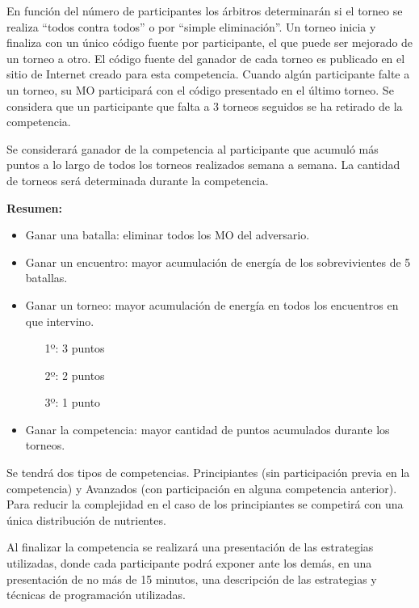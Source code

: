 \documentclass[11pt,a4paper]{article}
\begin{document}
En función del número de participantes los árbitros determinarán si el torneo se realiza ``todos contra todos'' o por ``simple eliminación''. Un torneo inicia y finaliza con un único código fuente por participante, el que puede ser mejorado de un torneo a otro. El código fuente del ganador de cada torneo es publicado en el sitio de Internet creado para esta competencia.
Cuando algún participante falte a un torneo, su MO participará con el código presentado en el último torneo. Se considera que un participante que falta a 3 torneos seguidos se ha retirado de la competencia.

Se considerará ganador de la competencia al participante que acumuló más puntos a lo largo de todos los torneos realizados semana a semana. La cantidad de torneos será determinada durante la competencia.

{\bf Resumen:}
\begin{itemize}
    \item Ganar una batalla: eliminar todos los MO del adversario.
    \item Ganar un encuentro: mayor acumulación de energía de los sobrevivientes de 5 batallas.
    \item Ganar un torneo: mayor acumulación de energía en todos los encuentros en que intervino.
    \begin{enumerate}
		\item[1º: ] 3 puntos 
		\item[2º: ] 2 puntos
		\item[3º: ] 1 punto
	\end{enumerate} 
    \item Ganar la competencia: mayor cantidad de puntos acumulados durante los torneos.
\end{itemize}

Se tendrá dos tipos de competencias. Principiantes (sin participación previa en la competencia) y Avanzados (con participación en alguna competencia anterior). Para reducir la complejidad en el caso de los principiantes se competirá con una única distribución de nutrientes.

Al finalizar la competencia se realizará una presentación de las estrategias utilizadas, donde cada participante podrá exponer ante los demás, en una presentación de no más de 15 minutos, una descripción de las estrategias y técnicas de programación utilizadas.
\end{document}
